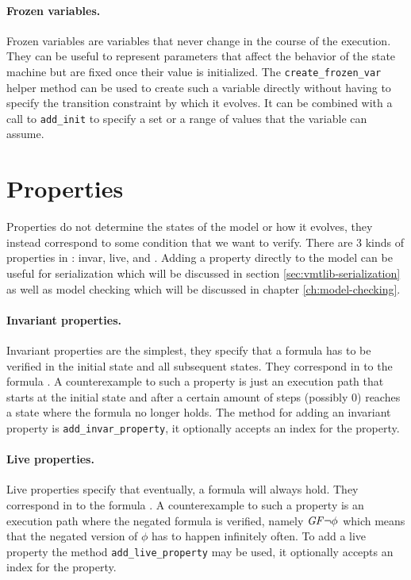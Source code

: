\paragraph*{Frozen variables.}
Frozen variables are variables that never change in the course of the execution.
They can be useful to represent parameters that affect the behavior of the state machine but are fixed once their value is initialized.
The \texttt{create\_frozen\_var} helper method can be used to create such a variable directly without having to specify the transition constraint by which it evolves. It can be combined with a call to \texttt{add\_init} to specify a set or a range of values that the variable can assume.

\section{Properties}
Properties do not determine the states of the model or how it evolves, they instead correspond to some condition that we want to verify.
There are 3 kinds of properties in \pyvmt{}: invar, live, and \ltl{}.
Adding a property directly to the model can be useful for serialization which will be discussed in section \ref{sec:vmtlib-serialization} as well as model checking which will be discussed in chapter \ref{ch:model-checking}.

\paragraph*{Invariant properties.}
Invariant properties are the simplest, they specify that a formula has to be verified in the initial state and all subsequent states.
They correspond in \ltl{} to the formula \fsafe{}.
A counterexample to such a property is just an execution path that starts at the initial state and after a certain amount of steps (possibly 0) reaches a state where the formula no longer holds.
The method for adding an invariant property is \texttt{add\_invar\_property}, it optionally accepts an index for the property.

\paragraph*{Live properties.}
Live properties specify that eventually, a formula will always hold.
They correspond in \ltl{} to the formula \flive{}.
A counterexample to such a property is an execution path where the negated formula is verified, namely $\mathit{G} \mathit{F} \lnot \phi$ which means that the negated version of $\phi$ has to happen infinitely often.
To add a live property the method \texttt{add\_live\_property} may be used, it optionally accepts an index for the property.

